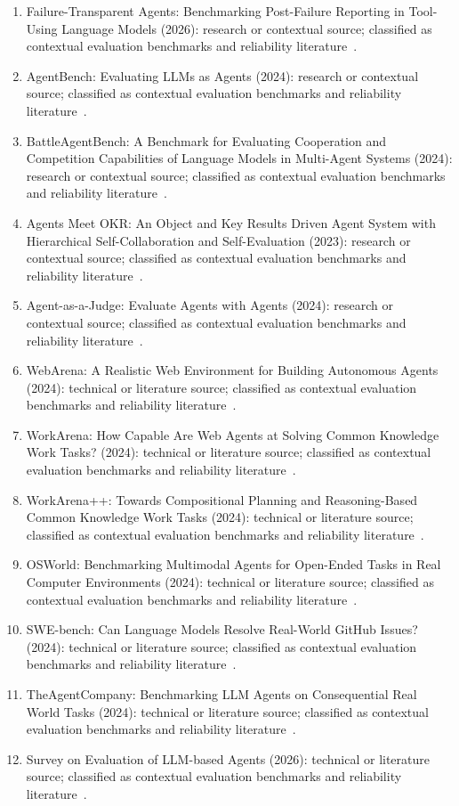 \begin{enumerate}
\item Failure-Transparent Agents: Benchmarking Post-Failure Reporting in Tool-Using Language Models (2026): research or contextual source; classified as contextual evaluation benchmarks and reliability literature~\cite{ext063}.
\item {AgentBench}: Evaluating {LLM}s as Agents (2024): research or contextual source; classified as contextual evaluation benchmarks and reliability literature~\cite{ext072}.
\item {BattleAgentBench}: A Benchmark for Evaluating Cooperation and Competition Capabilities of Language Models in Multi-Agent Systems (2024): research or contextual source; classified as contextual evaluation benchmarks and reliability literature~\cite{ext073}.
\item Agents Meet {OKR}: An Object and Key Results Driven Agent System with Hierarchical Self-Collaboration and Self-Evaluation (2023): research or contextual source; classified as contextual evaluation benchmarks and reliability literature~\cite{ext090}.
\item Agent-as-a-Judge: Evaluate Agents with Agents (2024): research or contextual source; classified as contextual evaluation benchmarks and reliability literature~\cite{ext101}.
\item {WebArena}: A Realistic Web Environment for Building Autonomous Agents (2024): technical or literature source; classified as contextual evaluation benchmarks and reliability literature~\cite{ext133}.
\item {WorkArena}: How Capable Are Web Agents at Solving Common Knowledge Work Tasks? (2024): technical or literature source; classified as contextual evaluation benchmarks and reliability literature~\cite{ext134}.
\item {WorkArena++}: Towards Compositional Planning and Reasoning-Based Common Knowledge Work Tasks (2024): technical or literature source; classified as contextual evaluation benchmarks and reliability literature~\cite{ext135}.
\item {OSWorld}: Benchmarking Multimodal Agents for Open-Ended Tasks in Real Computer Environments (2024): technical or literature source; classified as contextual evaluation benchmarks and reliability literature~\cite{ext136}.
\item {SWE-bench}: Can Language Models Resolve Real-World {GitHub} Issues? (2024): technical or literature source; classified as contextual evaluation benchmarks and reliability literature~\cite{ext137}.
\item {TheAgentCompany}: Benchmarking {LLM} Agents on Consequential Real World Tasks (2024): technical or literature source; classified as contextual evaluation benchmarks and reliability literature~\cite{ext138}.
\item Survey on Evaluation of {LLM}-based Agents (2026): technical or literature source; classified as contextual evaluation benchmarks and reliability literature~\cite{ext139}.
\end{enumerate}
\normalsize

